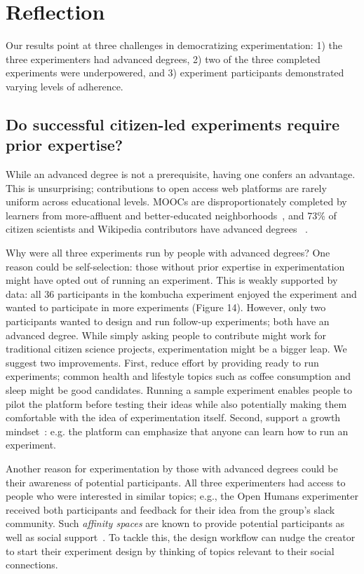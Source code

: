 \section{Reflection}
Our results point at three challenges in democratizing experimentation: 1) the three experimenters had advanced degrees, 2) two of the three completed experiments were underpowered, and 3) experiment participants demonstrated varying levels of adherence. 

\subsection{Do successful citizen-led experiments require prior expertise?}
While an advanced degree is not a prerequisite, having one confers an advantage. This is unsurprising; contributions to open access web platforms are rarely uniform across educational levels. MOOCs are disproportionately completed by learners from more-affluent and better-educated neighborhoods~\cite{hansen2015democratizing}, and 73\% of citizen scientists and Wikipedia contributors have advanced degrees~\cite{national2018learning, Wikipedia} . 

Why were all three experiments run by people with advanced degrees? One reason could be self-selection: those without prior expertise in experimentation might have opted out of running an experiment. This is weakly supported by data: all 36 participants in the kombucha experiment enjoyed the experiment and wanted to participate in more experiments (Figure 14). However, only two participants wanted to design and run follow-up experiments; both have an advanced degree. While simply asking people to contribute might work for traditional citizen science projects, experimentation might be a bigger leap. We suggest two improvements. First, reduce effort by providing ready to run experiments; common health and lifestyle topics such as coffee consumption and sleep might be good candidates. Running a sample experiment enables people to pilot the platform before testing their ideas while also potentially making them comfortable with the idea of experimentation itself. Second, support a growth mindset~\cite{dweck2016having}: e.g. the platform can emphasize that anyone can learn how to run an experiment.

Another reason for experimentation by those with advanced degrees could be their awareness of potential participants. All three experimenters had access to people who were interested in similar topics; e.g., the Open Humans experimenter received both participants and feedback for their idea from the group's slack community. Such \textit{affinity spaces} are known to provide potential participants as well as social support~\cite{gee2005semiotic}. To tackle this, the design workflow can nudge the creator to start their experiment design by thinking of topics relevant to their social connections.

